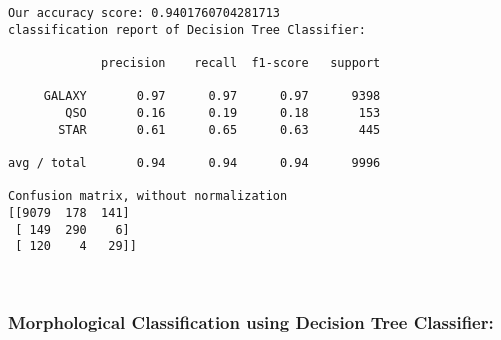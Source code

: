 \documentclass[11pt]{article}
\begin{document}
    \begin{Verbatim}[commandchars=\\\{\}]
Our accuracy score: 0.9401760704281713
classification report of Decision Tree Classifier:

             precision    recall  f1-score   support

     GALAXY       0.97      0.97      0.97      9398
        QSO       0.16      0.19      0.18       153
       STAR       0.61      0.65      0.63       445

avg / total       0.94      0.94      0.94      9996

Confusion matrix, without normalization
[[9079  178  141]
 [ 149  290    6]
 [ 120    4   29]]

    \end{Verbatim}

    \begin{center}
    \end{center}
    { \hspace*{\fill} \\}
    
    \subsubsection{Morphological Classification using Decision Tree
Classifier:}\label{morphological-classification-using-decision-tree-classifier}
\end{document}
